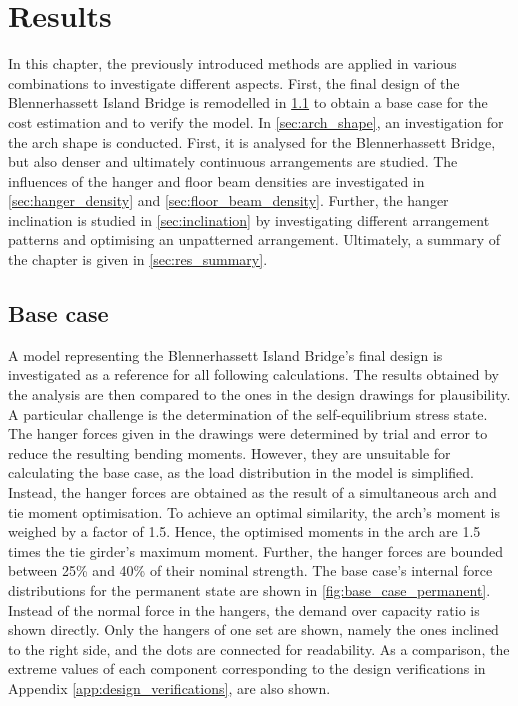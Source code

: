 \chapter{Results}\label{sec:results}
In this chapter, the previously introduced methods are applied in various combinations to investigate different aspects. First, the final design of the Blennerhassett Island Bridge is remodelled in \cref{sec:base_case} to obtain a base case for the cost estimation and to verify the model. In \cref{sec:arch_shape}, an investigation for the arch shape is conducted. First, it is analysed for the Blennerhassett Bridge, but also denser and ultimately continuous arrangements are studied. The influences of the hanger and floor beam densities are investigated in \cref{sec:hanger_density} and \cref{sec:floor_beam_density}. Further, the hanger inclination is studied in \cref{sec:inclination} by investigating different arrangement patterns and optimising an unpatterned arrangement. Ultimately, a summary of the chapter is given in \cref{sec:res_summary}.


\section{Base case} \label{sec:base_case}
A model representing the Blennerhassett Island Bridge's final design is investigated as a reference for all following calculations. The results obtained by the analysis are then compared to the ones in the design drawings for plausibility. A particular challenge is the determination of the self-equilibrium stress state. The hanger forces given in the drawings were determined by trial and error to reduce the resulting bending moments. However, they are unsuitable for calculating the base case, as the load distribution in the model is simplified. Instead, the hanger forces are obtained as the result of a simultaneous arch and tie moment optimisation. To achieve an optimal similarity, the arch's moment is weighed by a factor of 1.5. Hence, the optimised moments in the arch are 1.5 times the tie girder's maximum moment. 
Further, the hanger forces are bounded between 25\% and 40\% of their nominal strength. The base case's internal force distributions for the permanent state are shown in \cref{fig:base_case_permanent}. Instead of the normal force in the hangers, the demand over capacity ratio is shown directly. Only the hangers of one set are shown, namely the ones inclined to the right side, and the dots are connected for readability. As a comparison, the extreme values of each component corresponding to the design verifications in Appendix \ref{app:design_verifications}, are also shown.

